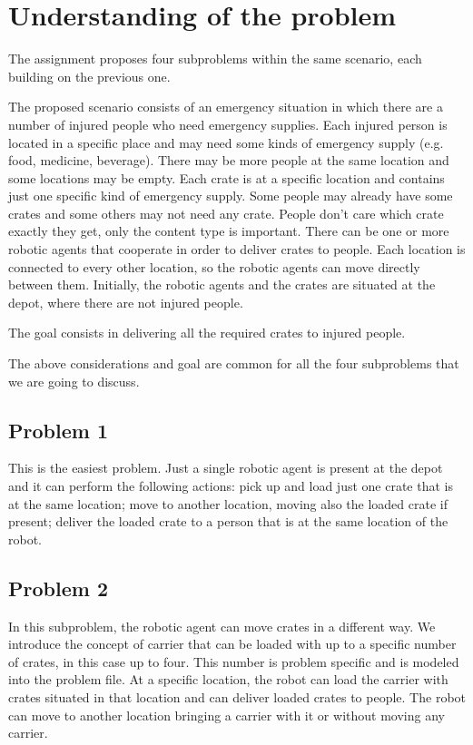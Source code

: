 
\section{Understanding of the problem}
\label{sec2}

The assignment proposes four subproblems within the same scenario, each building on the previous one.

The proposed scenario consists of an emergency situation in which there are a number of injured people 
who need emergency supplies.
Each injured person is located in a specific place and may need some kinds of emergency supply
(e.g. food, medicine, beverage). There may be more people at the same location and some 
locations may be empty.
Each crate is at a specific location and contains just one specific kind of emergency supply.
Some people may already have some crates and some others may not need any crate.
People don't care which crate exactly they get, only the content type is important.
There can be one or more robotic agents that cooperate in order to deliver crates to people.
Each location is connected to every other location, so the robotic agents can move directly between them.
Initially, the robotic agents and the crates are situated at the depot, where there are not injured people.

The goal consists in delivering all the required crates to injured people.

The above considerations and goal are common for all the four subproblems that we are going to discuss.

\subsection{Problem 1}
This is the easiest problem.
Just a single robotic agent is present at the depot and it can perform the following actions: 
pick up and load just one crate that is at the same location;
move to another location, moving also the loaded crate if present; 
deliver the loaded crate to a person that is at the same location of the robot.

\subsection{Problem 2}
In this subproblem, the robotic agent can move crates in a different way.
We introduce the concept of carrier that can be loaded with up to a specific number of crates, 
in this case up to four.
This number is problem specific and is modeled into the problem file.
At a specific location, the robot can load the carrier with crates situated in that location and can
deliver loaded crates to people.
The robot can move to another location bringing a carrier with it or without moving any carrier.

